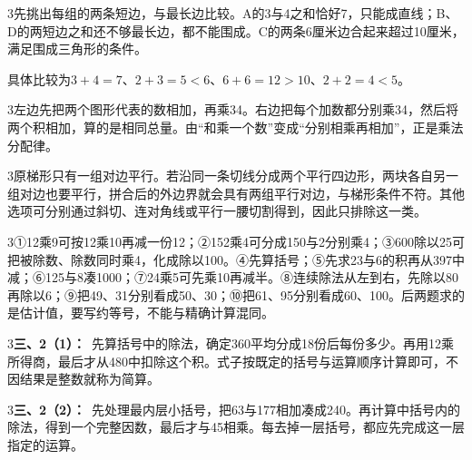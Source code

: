 \documentclass[multi=snippet,border={5bp 20bp 5bp 5bp}]{standalone}
\newenvironment{snippet}[3]{\begin{minipage}{#1bp}\color{answerred}\fontsize{#2}{#3}\selectfont\raggedright}{\end{minipage}}
\begin{document}
\begin{snippet}{505}{11.5}{14}\begin{multicols}{3}\raggedcolumns 先挑出每组的两条短边，与最长边比较。A的3与4之和恰好7，只能成直线；B、D的两短边之和还不够最长边，都不能围成。C的两条6厘米边合起来超过10厘米，满足围成三角形的条件。\par 具体比较为\(3+4=7\)\allowbreak 、\(2+3=5<6\)\allowbreak 、\(6+6=12>10\)\allowbreak 、\(2+2=4<5\)\allowbreak 。\end{multicols}\end{snippet}
\begin{snippet}{505}{11.5}{14}\begin{multicols}{3}\raggedcolumns 左边先把两个图形代表的数相加，再乘34。右边把每个加数都分别乘34，然后将两个积相加，算的是相同总量。由“和乘一个数”变成“分别相乘再相加”，正是乘法分配律。\end{multicols}\end{snippet}
\begin{snippet}{505}{11.5}{14}\begin{multicols}{3}\raggedcolumns 原梯形只有一组对边平行。若沿同一条切线分成两个平行四边形，两块各自另一组对边也要平行，拼合后的外边界就会具有两组平行对边，与梯形条件不符。其他选项可分别通过斜切、连对角线或平行一腰切割得到，因此只排除这一类。\end{multicols}\end{snippet}
\begin{snippet}{505}{11.5}{14}\begin{multicols}{3}\raggedcolumns ①12乘9可按12乘10再减一份12；②152乘4可分成150与2分别乘4；③600除以25可把被除数、除数同时乘4，化成除以100。④先算括号；⑤先求23与6的积再从397中减；⑥125与8凑1000；⑦24乘5可先乘10再减半。⑧连续除法从左到右，先除以80再除以6；⑨把49、31分别看成50、30；⑩把61、95分别看成60、100。后两题求的是估计值，要写约等号，不能与精确计算混同。\end{multicols}\end{snippet}
\begin{snippet}{505}{11.5}{14}\begin{multicols}{3}\raggedcolumns \textbf{三、2（1）：}\ 先算括号中的除法，确定360平均分成18份后每份多少。再用12乘所得商，最后才从480中扣除这个积。式子按既定的括号与运算顺序计算即可，不因结果是整数就称为简算。\end{multicols}\end{snippet}
\begin{snippet}{505}{11.5}{14}\begin{multicols}{3}\raggedcolumns \textbf{三、2（2）：}\ 先处理最内层小括号，把63与177相加凑成240。再计算中括号内的除法，得到一个完整因数，最后才与45相乘。每去掉一层括号，都应先完成这一层指定的运算。\end{multicols}\end{snippet}
\end{document}
